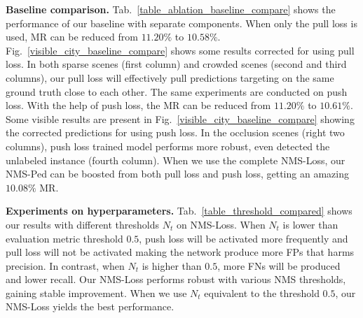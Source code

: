 \documentclass[sigconf]{acmart}
\begin{document}
\noindent
\textbf{Baseline comparison.}
Tab.~\ref{table_ablation_baseline_compare} shows the performance of our baseline with separate components. When only the pull loss is used, MR can be reduced from $11.20\%$ to $10.58\%$. Fig.~\ref{visible_city_baseline_compare} shows some results corrected for using pull loss. In both sparse scenes (first column) and crowded scenes (second and third columns), our pull loss will effectively pull predictions targeting on the same ground truth close to each other. The same experiments are conducted on push loss. With the help of push loss, the MR can be reduced from $11.20\%$ to $10.61\%$. Some visible results are present in Fig.~\ref{visible_city_baseline_compare} showing the corrected predictions for using push loss. In the occlusion scenes (right two columns), push loss trained model performs more robust, even detected the unlabeled instance (fourth column). When we use the complete NMS-Loss, our NMS-Ped can be boosted from both pull loss and push loss, getting an amazing $10.08\%$ MR.

\noindent
\textbf{Experiments on hyperparameters.}
Tab.~\ref{table_threshold_compared} shows our results with different thresholds $N_{t}$ on NMS-Loss.
When $N_{t}$ is lower than evaluation metric threshold $0.5$, push loss will be activated more frequently and pull loss will not be activated  making the network produce more FPs that harms precision.
In contrast, when $N_{t}$ is higher than $0.5$, more FNs will be produced and lower recall. Our NMS-Loss performs robust with various NMS thresholds, gaining stable improvement.
When we use $N_{t}$ equivalent to the threshold $0.5$, our NMS-Loss yields the best performance.

\begin{table}[t]
\setlength{\abovecaptionskip}{2mm}
\setlength{\belowcaptionskip}{2mm}
\caption{\textbf{Comparison on CityPersons dataset}.}
\vspace{-1mm}
\begin{center}
\end{center}
\vspace{-2mm}
\label{table_sota_compare_citypersons}
\end{table}
\end{document}
